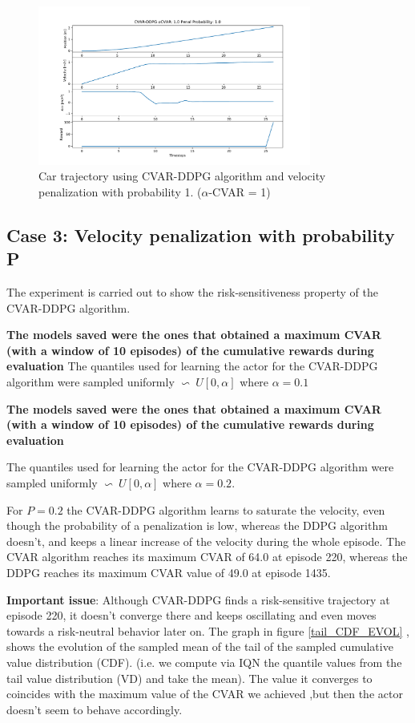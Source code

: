 \begin{figure}[ht]
        \centering
        \includegraphics[width=0.8\textwidth]{images/Car/CVAR/Trajectory_CVAR_ppenal1.pdf}
        \caption{Car trajectory using CVAR-DDPG algorithm and velocity penalization with probability 1. ($\alpha$-CVAR = 1)}
        \label{traj_cvarddpg_probpenal1_cvar1}
    
\end{figure}

\newpage
\subsection{Case 3: Velocity penalization with probability P }
The experiment is carried out to show the risk-sensitiveness property of the CVAR-DDPG algorithm.

\textbf{The models saved were the ones that obtained a maximum CVAR (with a window of 
10 episodes) of the cumulative rewards during evaluation}
The quantiles used for learning the actor for the CVAR-DDPG algorithm were sampled
uniformly $\backsim\ U[0,\alpha] $ where $\alpha=0.1$


\textbf{The models saved were the ones that obtained a maximum CVAR (with a window of 
10 episodes) of the cumulative rewards during evaluation}

The quantiles used for learning the actor for the
CVAR-DDPG algorithm were sampled uniformly $\backsim\ U[0,\alpha] $ where $\alpha=0.2$.


For $P=0.2$ the CVAR-DDPG algorithm learns to saturate the velocity, even though the
probability of a penalization is low, whereas the DDPG algorithm doesn't, and keeps a
linear increase of the velocity during the whole episode.
The CVAR algorithm reaches its maximum CVAR of 64.0 at episode 220, whereas the DDPG
reaches its maximum CVAR value of 49.0 at episode 1435.

\textbf{Important issue}: Although CVAR-DDPG finds a risk-sensitive trajectory at
episode 220, it doesn't converge there and keeps oscillating and even moves towards a
risk-neutral behavior later on.
The graph in figure \ref{tail_CDF_EVOL} , shows the evolution of the sampled mean of the
tail of the sampled cumulative value distribution (CDF). (i.e. we compute via IQN the
quantile values from the tail value distribution (VD) and take the mean).
The value it converges to coincides with the maximum value of the CVAR we achieved ,but
then the actor doesn't seem to behave accordingly.


